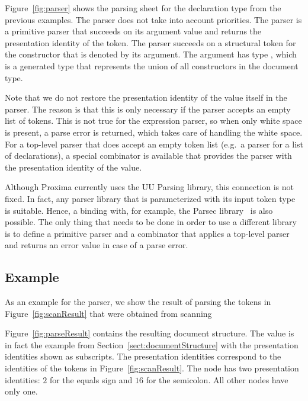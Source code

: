 \documentclass{article}[10pt]
\begin{document}
Figure~\ref{fig:parser} shows the parsing sheet for the declaration type from the previous examples. The parser does not take into account priorities.
The  parser is a primitive parser that succeeds on its argument  value and returns the presentation identity of the token. The  parser succeeds on a structural token for the constructor that is denoted by its argument. The argument has type , which is a generated type that represents the union of all constructors in the document type. 

Note that we do not restore the presentation identity of the  value itself in the  parser. The reason is that this is only necessary if the parser accepts an empty list of tokens. This is not true for the expression parser, so when only white space is present, a parse error is returned, which takes care of handling the white space. For a top-level parser that does accept an empty token list (e.g.\ a parser for a list of declarations), a special combinator is available that provides the parser with the presentation identity of the  value.

Although Proxima currently uses the UU Parsing library, this connection is not fixed. In fact, any  parser library that is parameterized with its input token type is suitable. Hence, a binding with, for example, the Parsec library~\cite{leijen08parsec} is also possible. The only thing that needs to be done in order to use a different library is to define a primitive parser  and a combinator that applies a top-level parser and returns an error value in case of a parse error.

\subsection{Example} \label{sect:parseExample}

As an example for the parser, we show the result of parsing the tokens in Figure~\ref{fig:scanResult} that were obtained from scanning ~ 

Figure~\ref{fig:parseResult} contains the resulting document structure. The value is in fact the example from Section~\ref{sect:documentStructure} with the presentation identities shown as subscripts. The presentation identities correspond to the identities of the tokens in Figure~\ref{fig:scanResult}. The  node has two presentation identities: $2$ for the equals sign and $16$ for the semicolon. All other nodes have only one. 
\end{document}
